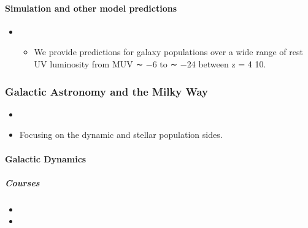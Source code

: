 \documentclass[letterpaper,10pt,english]{sphinxmanual}
\begin{document}
\paragraph{Simulation and other model predictions}
\label{\detokenize{resource/astro/topics/extragalactic_astronomy:simulation-and-other-model-predictions}}\begin{itemize}
\item {} 
\begin{itemize}
\item {} 
We provide predictions for galaxy populations over a wide range of
rest UV luminosity from MUV ∼ −6 to ∼ −24 between z = 4 \textendash{} 10.

\end{itemize}

\end{itemize}


\subsubsection{Galactic Astronomy and the Milky Way}
\label{\detokenize{resource/astro/topics/galactic_astronomy:galactic-astronomy-and-the-milky-way}}\label{\detokenize{resource/astro/topics/galactic_astronomy::doc}}\begin{itemize}
\item {} 

\item {} 
Focusing on the dynamic and stellar population sides.

\end{itemize}


\paragraph{Galactic Dynamics}
\label{\detokenize{resource/astro/topics/galactic_astronomy:galactic-dynamics}}

\subparagraph{Courses}
\label{\detokenize{resource/astro/topics/galactic_astronomy:courses}}\begin{itemize}
\item {} 

\item {} 

\end{itemize}
\end{document}
